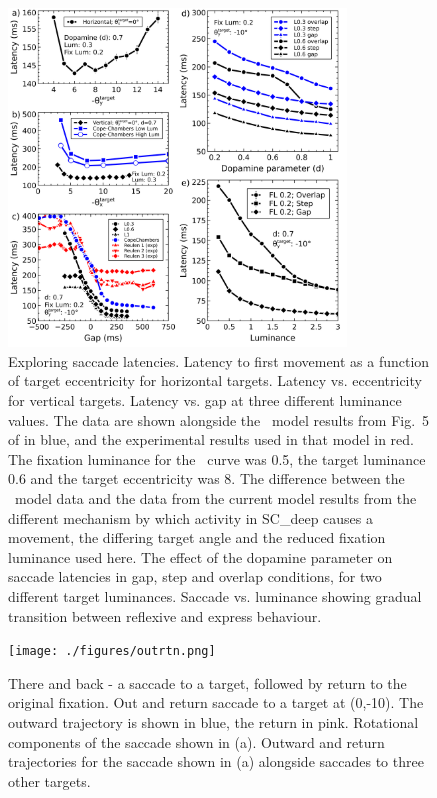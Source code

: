 \documentclass{frontiersSCNS}
\begin{document}
\begin{figure}[!ht]
\begin{center}
\includegraphics[width=0.8\textwidth]{./figures/lat_vs_everything.png}
\end{center}
\caption{ Exploring saccade latencies.  Latency to first movement as a
function of target eccentricity for horizontal targets.  Latency
vs. eccentricity for vertical targets.  Latency vs. gap at three
different luminance values. The data are shown alongside
the \ccg~model results from Fig.~5 of \cite{cope_basal_2017} in blue,
and the experimental results used in that model in red. The fixation
luminance for the \ccg~curve was 0.5, the target luminance 0.6 and
the target eccentricity was 8\dg. The difference between
the \ccg~model data and the data from the current model results from
the different mechanism by which activity in SC\_deep causes a
movement, the differing target angle and the reduced fixation
luminance used here.  The effect
of the dopamine parameter on saccade latencies in gap, step and
overlap conditions, for two different target luminances.   Saccade
vs. luminance showing gradual transition between reflexive and express
behaviour.
}
\label{fig:latvsall}
\end{figure}

\begin{figure}[!ht]
\begin{center}
\texttt{[image: ./figures/outrtn.png]}
\end{center}
\caption{ There and back - a saccade to a target, followed by return to the
original fixation.  Out and return saccade to a target at
(0,-10\dg). The outward trajectory is shown in blue, the return in pink.
 Rotational components of the saccade shown in (a).  Outward and
return trajectories for the saccade shown in (a) alongside saccades to
three other targets.}
\label{fig:outrtn}
\end{figure}
\end{document}

